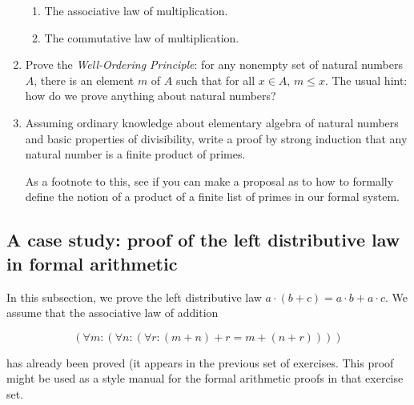 \documentclass[12pt]{book}
\begin{document}
\begin{enumerate}
\begin{enumerate}
\item The associative law of multiplication.

\item The commutative law of multiplication.

\end{enumerate}

\item  Prove the {\em Well-Ordering Principle\/}:  for any nonempty set of natural numbers $A$, there is an element $m$ of $A$ such that for all $x \in A$, $m \leq x$.  The usual hint:  how do we prove anything about natural numbers?

\item Assuming ordinary knowledge about elementary algebra of natural numbers and basic properties of divisibility, write a proof by strong induction that any natural number is a finite product of primes.

As a footnote to this, see if you can make a proposal as to how to formally define the notion of a product of a finite list of primes in our formal system.


\end{enumerate}

\newpage

\subsection{A case study:  proof of the left distributive law in formal arithmetic}

In this subsection, we prove the left distributive law $a\cdot (b+c) = a\cdot b +a\cdot c$.  We assume that the associative law of addition

$$(\forall m:(\forall n:(\forall r:(m+n)+r = m+(n+r))))$$

 has already been proved
(it appears in the previous set of exercises.  This proof might be used as a style manual for the formal arithmetic proofs in that exercise set.
\end{document}
